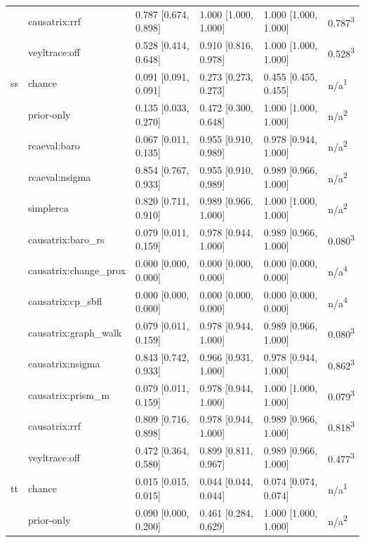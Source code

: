 \begin{table}[t]
\begin{tabular}{@{}llllll@{}}
 & causatrix:rrf & 0.787 [0.674, 0.898] & 1.000 [1.000, 1.000] & 1.000 [1.000, 1.000] & 0.787\textsuperscript{3} \\
 & veyltrace:off & 0.528 [0.414, 0.648] & 0.910 [0.816, 0.978] & 1.000 [1.000, 1.000] & 0.528\textsuperscript{3} \\
ss & chance & 0.091 [0.091, 0.091] & 0.273 [0.273, 0.273] & 0.455 [0.455, 0.455] & n/a\textsuperscript{1} \\
 & prior-only & 0.135 [0.033, 0.270] & 0.472 [0.300, 0.648] & 1.000 [1.000, 1.000] & n/a\textsuperscript{2} \\
 & rcaeval:baro & 0.067 [0.011, 0.135] & 0.955 [0.910, 0.989] & 0.978 [0.944, 1.000] & n/a\textsuperscript{2} \\
 & rcaeval:nsigma & 0.854 [0.767, 0.933] & 0.955 [0.910, 0.989] & 0.989 [0.966, 1.000] & n/a\textsuperscript{2} \\
 & simplerca & 0.820 [0.711, 0.910] & 0.989 [0.966, 1.000] & 1.000 [1.000, 1.000] & n/a\textsuperscript{2} \\
 & causatrix:baro\_rs & 0.079 [0.011, 0.159] & 0.978 [0.944, 1.000] & 0.989 [0.966, 1.000] & 0.080\textsuperscript{3} \\
 & causatrix:change\_prox & 0.000 [0.000, 0.000] & 0.000 [0.000, 0.000] & 0.000 [0.000, 0.000] & n/a\textsuperscript{4} \\
 & causatrix:cp\_sbfl & 0.000 [0.000, 0.000] & 0.000 [0.000, 0.000] & 0.000 [0.000, 0.000] & n/a\textsuperscript{4} \\
 & causatrix:graph\_walk & 0.079 [0.011, 0.159] & 0.978 [0.944, 1.000] & 0.989 [0.966, 1.000] & 0.080\textsuperscript{3} \\
 & causatrix:nsigma & 0.843 [0.742, 0.933] & 0.966 [0.931, 1.000] & 0.978 [0.944, 1.000] & 0.862\textsuperscript{3} \\
 & causatrix:prism\_m & 0.079 [0.011, 0.159] & 0.978 [0.944, 1.000] & 1.000 [1.000, 1.000] & 0.079\textsuperscript{3} \\
 & causatrix:rrf & 0.809 [0.716, 0.898] & 0.978 [0.944, 1.000] & 0.989 [0.966, 1.000] & 0.818\textsuperscript{3} \\
 & veyltrace:off & 0.472 [0.364, 0.580] & 0.899 [0.811, 0.967] & 0.989 [0.966, 1.000] & 0.477\textsuperscript{3} \\
tt & chance & 0.015 [0.015, 0.015] & 0.044 [0.044, 0.044] & 0.074 [0.074, 0.074] & n/a\textsuperscript{1} \\
 & prior-only & 0.090 [0.000, 0.200] & 0.461 [0.284, 0.629] & 1.000 [1.000, 1.000] & n/a\textsuperscript{2} \\

\end{tabular}
\end{table}
